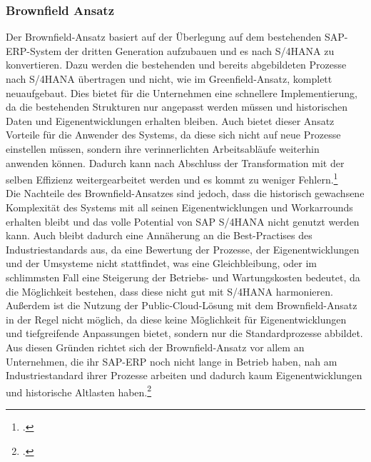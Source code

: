 \subsubsection{Brownfield Ansatz}
Der Brownfield-Ansatz basiert auf der Überlegung auf dem bestehenden SAP-ERP-System der dritten Generation aufzubauen und es nach S/4HANA zu konvertieren. Dazu werden die bestehenden und bereits abgebildeten Prozesse nach S/4HANA übertragen und nicht, wie im Greenfield-Ansatz, komplett neuaufgebaut. Dies bietet für die Unternehmen eine schnellere Implementierung, da die bestehenden Strukturen nur angepasst werden müssen und historischen Daten und Eigenentwicklungen erhalten bleiben. Auch bietet dieser Ansatz Vorteile für die Anwender des Systems, da diese sich nicht auf neue Prozesse einstellen müssen, sondern ihre verinnerlichten Arbeitsabläufe weiterhin anwenden können. Dadurch kann nach Abschluss der Transformation mit der selben Effizienz weitergearbeitet werden und es kommt zu weniger Fehlern.\footcite[Vgl.][]{gambit-transformation}
\\Die Nachteile des Brownfield-Ansatzes sind jedoch, dass die historisch gewachsene Komplexität des Systems mit all seinen Eigenentwicklungen und Workarrounds erhalten bleibt und das volle Potential von SAP S/4HANA nicht genutzt werden kann. Auch bleibt dadurch eine Annäherung an die Best-Practises des Industriestandards aus, da eine Bewertung der Prozesse, der Eigenentwicklungen und der Umsysteme nicht stattfindet, was eine Gleichbleibung, oder im schlimmsten Fall eine Steigerung der Betriebs- und Wartungskosten bedeutet, da die Möglichkeit bestehen, dass diese nicht gut mit S/4HANA harmonieren. Außerdem ist die Nutzung der Public-Cloud-Lösung mit dem Brownfield-Ansatz in der Regel nicht möglich, da diese keine Möglichkeit für Eigenentwicklungen und tiefgreifende Anpassungen bietet, sondern nur die Standardprozesse abbildet. Aus diesen Gründen richtet sich der Brownfield-Ansatz vor allem an Unternehmen, die ihr SAP-ERP noch nicht lange in Betrieb haben, nah am Industriestandard ihrer Prozesse arbeiten und dadurch kaum Eigenentwicklungen und historische \glqq{}Altlasten\grqq{} haben.\footcite[Vgl.][]{gambit-transformation}

